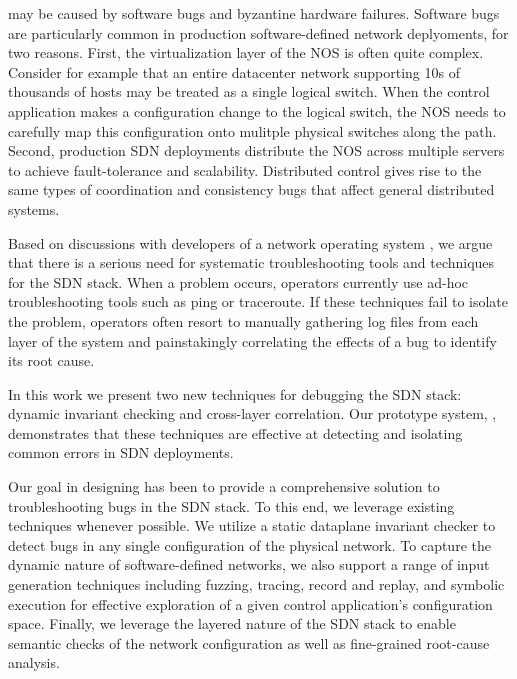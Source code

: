
 may be caused by software bugs and
byzantine hardware failures. Software bugs are particularly common in
production software-defined network deplyoments, for two reasons. First, the
virtualization layer of the NOS is often quite complex. Consider for example
that an entire datacenter network supporting 10s of thousands of hosts may be
treated as a single logical switch. When the control application makes a
configuration change to the logical switch, the NOS needs to carefully map this
configuration onto mulitple physical switches along the path. Second,
production SDN deployments distribute the NOS across multiple servers to achieve fault-tolerance
and scalability. Distributed control gives rise to the same types of coordination
and consistency bugs that affect general distributed systems.


Based on discussions with developers of a network operating system
\cite{Nicira}, we argue that there is a serious need for systematic troubleshooting
tools and techniques for the SDN stack. When a problem occurs,
operators currently use ad-hoc troubleshooting tools such as ping or traceroute.
If these techniques fail to isolate the problem, operators often resort to
manually gathering log files from each layer of the system and painstakingly
correlating the effects of a bug to identify its root cause.

In this work we present two new techniques for debugging the SDN stack:
dynamic invariant checking and cross-layer correlation. Our prototype system,
\projectname{}, demonstrates that these techniques are effective at detecting and
isolating common errors in SDN deployments.

Our goal in designing \projectname{} has been to provide a comprehensive solution to
troubleshooting bugs in the SDN stack. To this end, we
leverage existing techniques whenever possible. We utilize a static dataplane invariant
checker \cite{anteater} to detect bugs in any single configuration of the
physical network. To capture the dynamic nature of software-defined networks,
we also support a range of input generation techniques including fuzzing, tracing, record and
replay, and symbolic execution for effective exploration of a given control
application's configuration space. Finally, we leverage the layered nature of the
SDN stack to enable semantic checks of the network configuration  as
well as fine-grained root-cause analysis.

